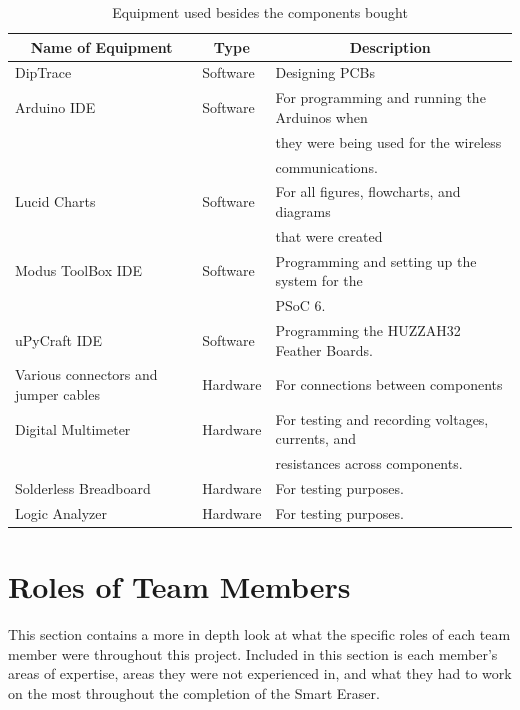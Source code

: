 \begin{table} [H]
	\normalsize
	\centering
	\begin{tabular}{|l|l|l|}
		\hline
		\multicolumn{1}{|c|}{\textbf{Name of Equipment}}  & 
		\multicolumn{1}{|c|}{\textbf{Type}}  & 
		\multicolumn{1}{|c|}{\textbf{Description}} \\
		\hline
				DipTrace 	&  Software		& Designing PCBs \\
		\hline
				Arduino IDE 	&  Software		& For programming and running the Arduinos when \\
								&  				& they were being used for the wireless \\
								&  				& communications. \\
	    \hline
				Lucid Charts 	&  Software		& For all figures, flowcharts, and diagrams \\
								&  				& that were created \\
		\hline
				Modus ToolBox IDE 	&  Software		& Programming and setting up the system for the \\
									&  				& PSoC 6. \\
		\hline
				uPyCraft IDE 	&  Software		& Programming the HUZZAH32 Feather Boards. \\
		\hline
				Various connectors and jumper cables	&  Hardware		& For connections between components  \\
		\hline
				Digital Multimeter 	&  Hardware		& For testing and recording voltages, currents, and \\
									&  				& resistances across components. \\
		\hline
				Solderless Breadboard 	&  Hardware		& For testing purposes. \\
		\hline
				Logic Analyzer 	&  Hardware		& For testing purposes. \\

		\hline 
	\end{tabular} 
	\caption{Equipment used besides the components bought}
	\label{table:2}
\end{table}	

\section{Roles of Team Members}
This section contains a more in depth look at what the specific roles of each team member were throughout this project. Included in this section is each member's areas of expertise, areas they were not experienced in, and what they had to work on the most throughout the completion of the Smart Eraser.
